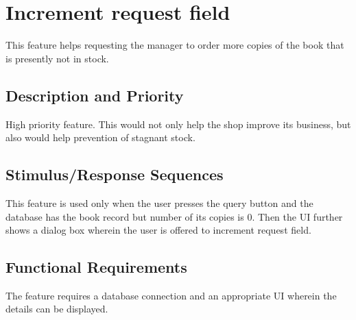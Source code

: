 \documentclass{scrreprt}
\begin{document}
\section{Increment request field}

This feature helps requesting the manager to order more copies of the book that is presently not in stock. 
\subsection{Description and Priority}
High priority feature. This would not only help the shop improve its business, but also would help prevention of stagnant stock. 

\subsection{Stimulus/Response Sequences}
This feature is used only when the user presses the query button and the database has the book record but number of its copies is 0. Then the UI further shows a dialog box wherein the user is offered to increment request field.

\subsection{Functional Requirements}
The feature requires a database connection and an appropriate  UI wherein the details can be displayed.
\end{document}
